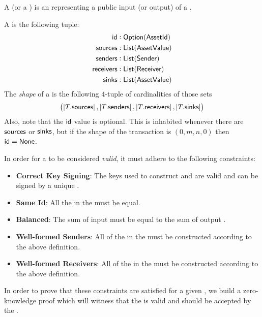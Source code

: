 \begin{definition}
    A \Source{} (or a \Sink{}) is an \Asset{} representing a public input (or output) of a \Transfer{}.
\end{definition}

\begin{definition}
    A \Transfer{} is the following tuple:
    \begin{align*}
        {\textsf{id}}        &: {\textsf{Option}}({\textsf{AssetId}}) \\
        {\textsf{sources}}   &: {\textsf{List}}({\textsf{AssetValue}}) \\
        {\textsf{senders}}   &: {\textsf{List}}({\textsf{Sender}}) \\
        {\textsf{receivers}} &: {\textsf{List}}({\textsf{Receiver}}) \\
        {\textsf{sinks}}     &: {\textsf{List}}({\textsf{AssetValue}})
    \end{align*}
    The \emph{shape} of a \Transfer{} is the following $4$-tuple of cardinalities of those sets
    \[\left(\left|T.{\textsf{sources}}\right|, \left|T.{\textsf{senders}}\right|, \left|T.{\textsf{receivers}}\right|, \left|T.{\textsf{sinks}}\right|\right)\]
    Also, note that the ${\textsf{id}}$ value is optional. This is inhabited whenever there are ${\textsf{sources}}$ or ${\textsf{sinks}}$, but if the shape of the transaction is $(0, m, n, 0)$ then ${\textsf{id}} = {\textsf{None}}$.
\end{definition}

In order for a \Transfer{} to be considered \emph{valid}, it must adhere to the following constraints:

\begin{itemize}
    \item \textbf{Correct Key Signing}: The keys used to construct  and  are valid and can be signed by a unique \SpendingKey{}.
    \item \textbf{Same Id}: All the  in the \Transfer{} must be equal.
    \item \textbf{Balanced}: The sum of input  must be equal to the sum of output .
    \item \textbf{Well-formed Senders}: All of the  in the \Transfer{} must be constructed according to the above \Sender{} definition.
    \item \textbf{Well-formed Receivers}: All of the  in the \Transfer{} must be constructed according to the above \Receiver{} definition.
\end{itemize}

In order to prove that these constraints are satisfied for a given \Transfer{}, we build a zero-knowledge proof which will witness that the \Transfer{} is valid and should be accepted by the \Ledger{}.

